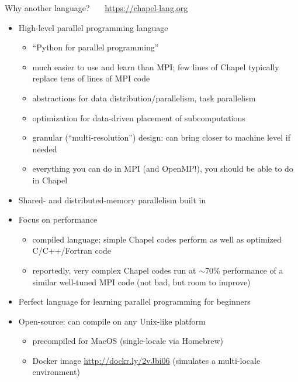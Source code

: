 \documentclass[10pt,xcolor=pdftex,dvipsnames,table]{beamer}
\begin{document}
\begin{frame}{Why another language? ~~~{\large\url{https://chapel-lang.org}}}
  \begin{itemize}\setlength{\itemsep}{2mm}
  \item High-level parallel programming language
    \begin{itemize}\setlength{\itemsep}{0.5mm}
    \item ``Python for parallel programming''
    \item much easier to use and learn than MPI; few lines of Chapel typically replace tens of lines
      of MPI code
    \item abstractions for data distribution/parallelism, task parallelism
    \item optimization for data-driven placement of subcomputations
    \item granular (``multi-resolution'') design: can bring closer to machine level if needed
    \item everything you can do in MPI (and OpenMP!), you should be able to do in Chapel
    \end{itemize}
  \item Shared- and distributed-memory parallelism built in
  \item Focus on performance
    \smallskip
    \begin{itemize}\setlength{\itemsep}{1mm}
    \item compiled language; simple Chapel codes perform as well as optimized C/C++/Fortran code
    \item reportedly, very complex Chapel codes run at $\sim$70\% performance of a similar well-tuned
      MPI code (not bad, but room to improve)
    \end{itemize}
  \item Perfect language for learning parallel programming for beginners
  \item Open-source: can compile on any Unix-like platform
    \begin{itemize}\setlength{\itemsep}{1mm}
    \item precompiled for MacOS (single-locale via Homebrew)
    \item Docker image \url{http://dockr.ly/2vJbi06} (simulates a multi-locale environment)
    \end{itemize}
  \end{itemize}
\end{frame}
\end{document}
